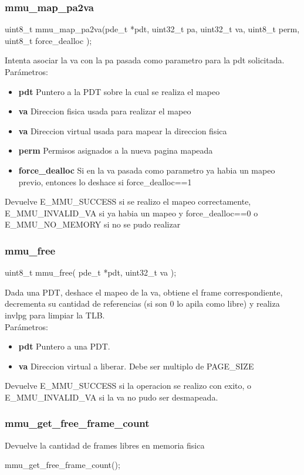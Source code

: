\subsubsection{mmu\_map\_pa2va}
\begin{verbatimtab}
 uint8_t mmu_map_pa2va(pde_t *pdt, uint32_t pa, uint32_t va, uint8_t perm, uint8_t force_dealloc );
\end{verbatimtab}
Intenta asociar la va con la pa pasada como parametro para la pdt solicitada.\\
Parámetros:
\begin{itemize}
 \item \textbf{pdt} Puntero a la PDT sobre la cual se realiza el mapeo
 \item \textbf{va} Direccion fisica usada para realizar el mapeo
 \item \textbf{va} Direccion virtual usada para mapear la direccion fisica
 \item \textbf{perm} Permisos asignados a la nueva pagina mapeada
 \item \textbf{force\_dealloc} Si en la va pasada como parametro ya habia un mapeo previo, entonces lo deshace si force\_dealloc==1
\end{itemize}
Devuelve E\_MMU\_SUCCESS si se realizo el mapeo correctamente, E\_MMU\_INVALID\_VA si ya habia un mapeo y force\_dealloc==0 o E\_MMU\_NO\_MEMORY si no se pudo realizar

\subsubsection{mmu\_free}
\begin{verbatimtab}
 uint8_t mmu_free( pde_t *pdt, uint32_t va );
\end{verbatimtab}
Dada una PDT, deshace el mapeo de la va, obtiene el frame correspondiente, decrementa su cantidad de 
referencias (si son 0 lo apila como libre) y realiza invlpg para limpiar la TLB. \\
Parámetros:
\begin{itemize}
  \item \textbf{pdt} Puntero a una PDT.
  \item \textbf{va}  Direccion virtual a liberar. Debe ser multiplo de PAGE\_SIZE
\end{itemize}
Devuelve E\_MMU\_SUCCESS si la operacion se realizo con exito, o E\_MMU\_INVALID\_VA si la va no pudo ser desmapeada.

\subsubsection{mmu\_get\_free\_frame\_count}
Devuelve la cantidad de frames libres en memoria fisica
\begin{verbatimtab}
 mmu_get_free_frame_count(); 
\end{verbatimtab}

